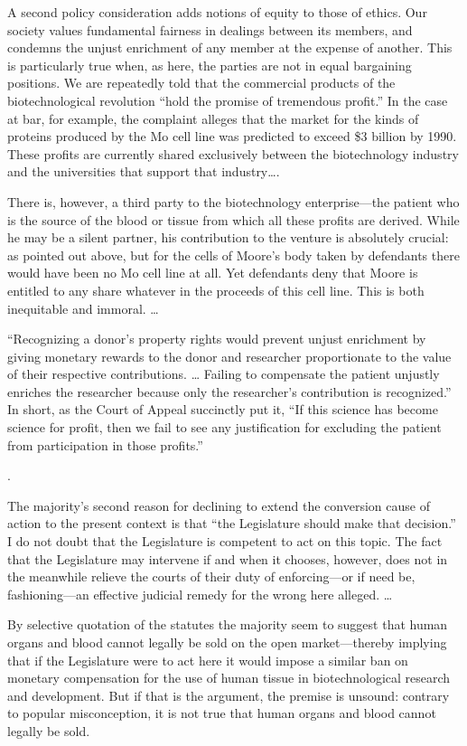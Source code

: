 A second policy consideration adds notions of equity to those of ethics. Our
society values fundamental fairness in dealings between its members, and
condemns the unjust enrichment of any member at the expense of another. This is
particularly true when, as here, the parties are not in equal bargaining
positions. We are repeatedly told that the commercial products of the
biotechnological revolution ``hold the promise of tremendous profit.'' In the
case at bar, for example, the complaint alleges that the market for the kinds
of proteins produced by the Mo cell line was predicted to exceed \$3 billion by
1990. These profits are currently shared exclusively between the biotechnology
industry and the universities that support that industry{\dots}.

There is, however, a third party to the biotechnology enterprise---the patient
who is the source of the blood or tissue from which all these profits are
derived. While he may be a silent partner, his contribution to the venture is
absolutely crucial: as pointed out above, but for the cells of Moore's body
taken by defendants there would have been no Mo cell line at all. Yet
defendants deny that Moore is entitled to any share whatever in the proceeds of
this cell line. This is both inequitable and immoral. {\dots}

{}``Recognizing a donor's property rights would prevent unjust enrichment by
giving monetary rewards to the donor and researcher proportionate to the value
of their respective contributions. {\dots} Failing to compensate the patient
unjustly enriches the researcher because only the researcher's contribution is
recognized.'' In short, as the Court of Appeal succinctly put it, ``If this
science has become science for profit, then we fail to see any justification
for excluding the patient from participation in those profits.''

{.
\par}

The majority's second reason for declining to extend the conversion cause of
action to the present context is that ``the Legislature should make that
decision.'' I do not doubt that the Legislature is competent to act on this
topic. The fact that the Legislature may intervene if and when it chooses,
however, does not in the meanwhile relieve the courts of their duty of
enforcing---or if need be, fashioning---an effective judicial remedy for the
wrong here alleged. {\dots}

By selective quotation of the statutes the majority seem to suggest that human
organs and blood cannot legally be sold on the open market---thereby implying
that if the Legislature were to act here it would impose a similar ban on
monetary compensation for the use of human tissue in biotechnological research
and development. But if that is the argument, the premise is unsound: contrary
to popular misconception, it is not true that human organs and blood cannot
legally be sold.


